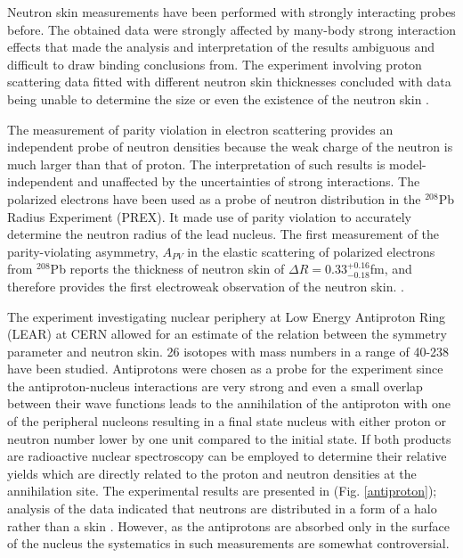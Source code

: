 \indent Neutron skin measurements have been performed with strongly interacting probes before. The obtained data were strongly affected by many-body strong interaction effects that made the analysis and interpretation of the results ambiguous and difficult to draw binding conclusions from. The experiment involving proton scattering data fitted with different neutron skin thicknesses concluded with data being unable to determine the size or even the existence of the neutron skin \cite{piek}.

\indent The measurement of parity violation in electron scattering provides an independent probe of neutron densities because the weak charge of the neutron is much larger than that of proton. The interpretation of such results is model-independent and unaffected by the uncertainties of strong interactions. The polarized electrons have been used as a probe of neutron distribution in the $^{208}$Pb Radius Experiment (PREX). It made use of parity violation to accurately determine the neutron radius of the lead nucleus. The first measurement of the parity-violating asymmetry, $A_{PV}$ in the elastic scattering of polarized electrons from $^{208}$Pb reports the thickness of neutron skin of $\Delta R = 0.33_{-0.18}^{+0.16}$fm, and therefore provides the first electroweak observation of the neutron skin. \cite{prex}.

\indent The experiment investigating nuclear periphery at Low Energy Antiproton Ring (LEAR) at CERN allowed for an estimate of the relation between the symmetry parameter and neutron skin. 26 isotopes with mass numbers in a range of 40-238 have been studied. Antiprotons were chosen as a probe for the experiment since the antiproton-nucleus interactions are very strong and even a small overlap between their wave functions leads to the annihilation of the antiproton with one of the peripheral nucleons resulting in a final state nucleus with either proton or neutron number lower by one unit compared to the initial state. If both products are radioactive nuclear spectroscopy can be employed to determine their relative yields which are directly related to the proton and neutron densities at the annihilation site. The experimental results are presented in (Fig. \ref{antiproton}); analysis of the data indicated that neutrons are distributed in a form of a halo rather than a skin \cite{trzcina}. However, as the antiprotons are absorbed only in the surface of the nucleus the systematics in such measurements are somewhat controversial.

